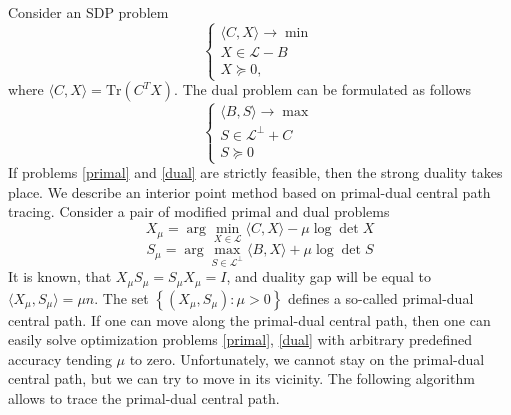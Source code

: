 \documentclass[12pt]{article}
\begin{document}
Consider an SDP problem
\begin{equation}
\label{primal}
	\begin{cases}
		\langle C, X \rangle \longrightarrow \min \\
		X \in \mathcal L - B \\
		X \succeq 0,
	\end{cases}
\end{equation}
where $\langle C, X \rangle  = \text{Tr}(C^T X)$.
The dual problem can be formulated as follows
\begin{equation}
\label{dual}
	\begin{cases}
		\langle B, S \rangle \longrightarrow \max \\
		S \in \mathcal L^\perp + C \\
		S \succeq 0
	\end{cases}
\end{equation}
If problems \ref{primal} and \ref{dual} are strictly feasible, then the strong duality takes 
place.
We describe an interior point method based on primal-dual central path tracing.
Consider a pair of modified primal and dual problems
\begin{equation}
	X_\mu = \arg\min\limits_{X \in \mathcal L} \langle C, X \rangle - \mu \log\det X
\end{equation}
\begin{equation}
	S_\mu = \arg\max\limits_{S \in \mathcal L^\perp} \langle B, X \rangle + \mu \log\det S
\end{equation}
It is known, that $X_\mu S_\mu = S_\mu X_\mu = I$, and duality gap will be equal to 
$\langle X_\mu, S_\mu \rangle = \mu n$.
The set $\left\{ (X_\mu, S_\mu) : \mu > 0 \right\}$ defines a so-called primal-dual central 
path.
If one can move along the primal-dual central path, then one can easily solve 
optimization problems \ref{primal}, \ref{dual} with arbitrary predefined accuracy tending 
$\mu$ to zero.
Unfortunately, we cannot stay on the primal-dual central path, but we can try to move in 
its vicinity.
The following algorithm allows to trace the primal-dual central path.
\end{document}
